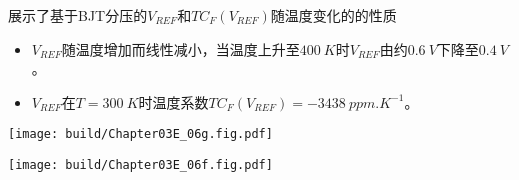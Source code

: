 展示了基于BJT分压的$V_{REF}$和$TC_F(V_{REF})$随温度变化的的性质
\begin{itemize}
    \item $V_{REF}$随温度增加而线性减小，当温度上升至$\SI{400}{K}$时$V_{REF}$由约$\SI{0.6}{V}$下降至$\SI{0.4}{V}$。
    \item $V_{REF}$在$T=\SI{300}{K}$时温度系数$TC_F(V_{REF})=\SI{-3438}{ppm.K^{-1}}$。
\end{itemize}
\begin{Figure}[基于BJT分压的基准的温度性质]
    \begin{FigureSub}[基于BJT分压的基准的温度特性]
        \texttt{[image: build/Chapter03E\_06g.fig.pdf]}
    \end{FigureSub}
    \begin{FigureSub}[基于BJT分压的基准的温度系数]
        \texttt{[image: build/Chapter03E\_06f.fig.pdf]}
    \end{FigureSub}
\end{Figure}

